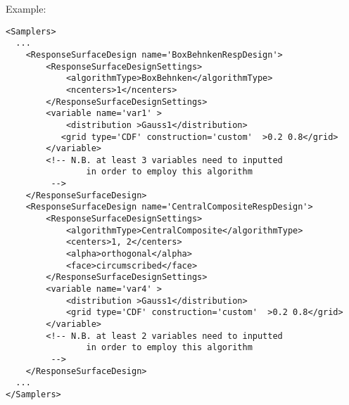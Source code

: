 Example:
\begin{lstlisting}[style=XML,morekeywords={}]
<Samplers>
  ...
    <ResponseSurfaceDesign name='BoxBehnkenRespDesign'>
        <ResponseSurfaceDesignSettings>
            <algorithmType>BoxBehnken</algorithmType>
            <ncenters>1</ncenters>
        </ResponseSurfaceDesignSettings>
        <variable name='var1' >
            <distribution >Gauss1</distribution>
           <grid type='CDF' construction='custom'  >0.2 0.8</grid>
        </variable>
        <!-- N.B. at least 3 variables need to inputted
                in order to employ this algorithm
         -->
    </ResponseSurfaceDesign>
    <ResponseSurfaceDesign name='CentralCompositeRespDesign'>
        <ResponseSurfaceDesignSettings>
            <algorithmType>CentralComposite</algorithmType>
            <centers>1, 2</centers>
            <alpha>orthogonal</alpha>
            <face>circumscribed</face>
        </ResponseSurfaceDesignSettings>
        <variable name='var4' >
            <distribution >Gauss1</distribution>
            <grid type='CDF' construction='custom'  >0.2 0.8</grid>
        </variable>
        <!-- N.B. at least 2 variables need to inputted
                in order to employ this algorithm
         -->
    </ResponseSurfaceDesign>
  ...
</Samplers>
\end{lstlisting}

